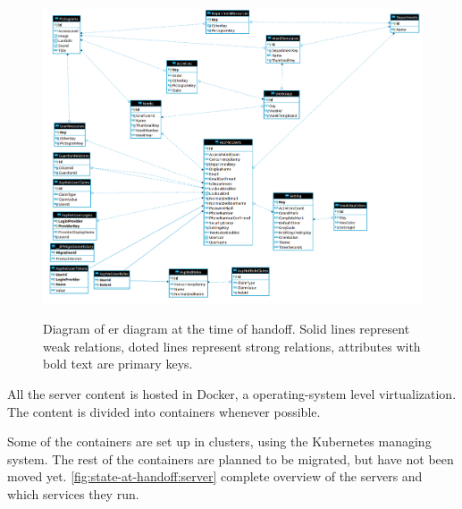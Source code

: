 \begin{figure}[ht]
    \centering
    \caption{Diagram of \gls{er} diagram at the time of handoff. Solid lines represent weak relations, doted lines represent strong relations, attributes with bold text are primary keys.}
    \includegraphics[width=1\textwidth]{figures/db_ho.png}
    \label{fig:state-at-handoff:db}
\end{figure}

All the server content is hosted in Docker, a operating-system level virtualization. The content is divided into containers whenever possible. 

Some of the containers are set up in clusters, using the Kubernetes managing system. The rest of the containers are planned to be migrated, but have not been moved yet. \ref{fig:state-at-handoff:server} complete overview of the servers and which services they run.


